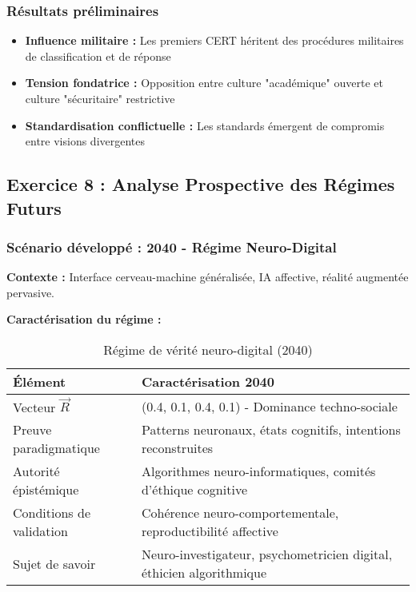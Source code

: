 \documentclass[12pt,a4paper]{article}
\begin{document}
\subsubsection{Résultats préliminaires}

\begin{itemize}
\item \textbf{Influence militaire :} Les premiers CERT héritent des procédures militaires de classification et de réponse
\item \textbf{Tension fondatrice :} Opposition entre culture "académique" ouverte et culture "sécuritaire" restrictive
\item \textbf{Standardisation conflictuelle :} Les standards émergent de compromis entre visions divergentes
\end{itemize}

\subsection{Exercice 8 : Analyse Prospective des Régimes Futurs}

\subsubsection{Scénario développé : 2040 - Régime Neuro-Digital}

\textbf{Contexte :} Interface cerveau-machine généralisée, IA affective, réalité augmentée pervasive.

\textbf{Caractérisation du régime :}

\begin{table}[H]
\centering
\begin{tabular}{|p{}|p{}|}
\hline
\textbf{Élément} & \textbf{Caractérisation 2040} \\
\hline
Vecteur $\vec{R}$ & (0.4, 0.1, 0.4, 0.1) - Dominance techno-sociale \\
\hline
Preuve paradigmatique & Patterns neuronaux, états cognitifs, intentions reconstruites \\
\hline
Autorité épistémique & Algorithmes neuro-informatiques, comités d'éthique cognitive \\
\hline
Conditions de validation & Cohérence neuro-comportementale, reproductibilité affective \\
\hline
Sujet de savoir & Neuro-investigateur, psychometricien digital, éthicien algorithmique \\
\hline
\end{tabular}
\caption{Régime de vérité neuro-digital (2040)}
\end{table}
\end{document}
